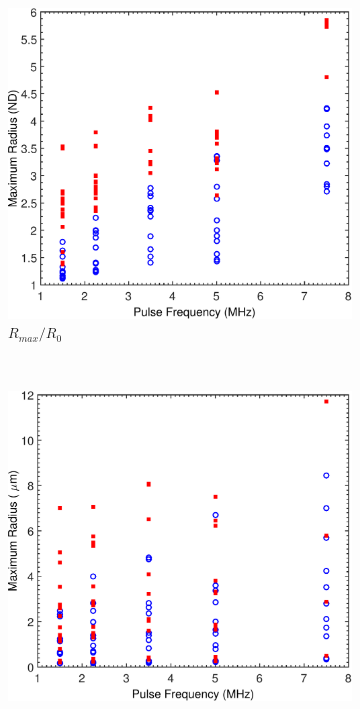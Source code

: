\begin{figure}[t]
  \centering
  \begin{subfigure}{0.47\textwidth}
    \includegraphics[width=\textwidth]{figs/bubble_figs/Rstarmax_F}
    \caption[Dependence of maximum dimensionless bubble radius on pulse frequency]{$R_{max}/R_0$}
    \label{fig:usbe_bubble_ndradius_frequency}
  \end{subfigure}  
  ~
  \begin{subfigure}{0.47\textwidth}
    \includegraphics[width=\textwidth]{figs/bubble_figs/rmax_F}

\end{subfigure}
\end{figure}
